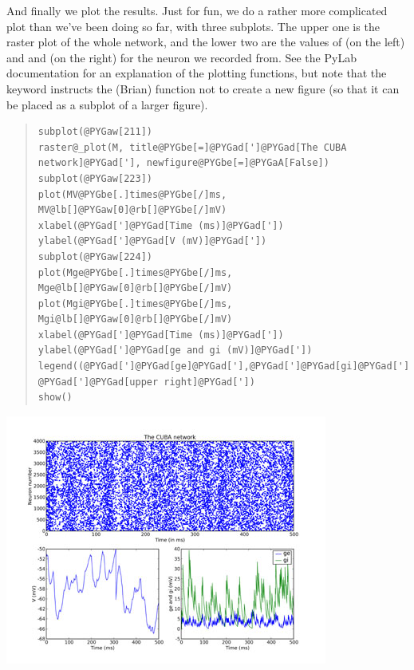 \documentclass[letterpaper,10pt,english]{manual}
\begin{document}
And finally we plot the results. Just for fun, we do a rather more
complicated plot than we've been doing so far, with three subplots.
The upper one is the raster plot of the whole network, and the
lower two are the values of  (on the left) and  and  (on the
right) for the neuron we recorded from. See the PyLab documentation
for an explanation of the plotting functions, but note that the
\hyperlink{brian.raster_plot}{} keyword  instructs the (Brian) function
\hyperlink{brian.raster_plot}{} not to create a new figure (so that it can be placed
as a subplot of a larger figure).
\begin{quote}

\begin{Verbatim}[commandchars=@\[\]]
subplot(@PYGaw[211])
raster@_plot(M, title@PYGbe[=]@PYGad[']@PYGad[The CUBA network]@PYGad['], newfigure@PYGbe[=]@PYGaA[False])
subplot(@PYGaw[223])
plot(MV@PYGbe[.]times@PYGbe[/]ms, MV@lb[]@PYGaw[0]@rb[]@PYGbe[/]mV)
xlabel(@PYGad[']@PYGad[Time (ms)]@PYGad['])
ylabel(@PYGad[']@PYGad[V (mV)]@PYGad['])
subplot(@PYGaw[224])
plot(Mge@PYGbe[.]times@PYGbe[/]ms, Mge@lb[]@PYGaw[0]@rb[]@PYGbe[/]mV)
plot(Mgi@PYGbe[.]times@PYGbe[/]ms, Mgi@lb[]@PYGaw[0]@rb[]@PYGbe[/]mV)
xlabel(@PYGad[']@PYGad[Time (ms)]@PYGad['])
ylabel(@PYGad[']@PYGad[ge and gi (mV)]@PYGad['])
legend((@PYGad[']@PYGad[ge]@PYGad['],@PYGad[']@PYGad[gi]@PYGad[']), @PYGad[']@PYGad[upper right]@PYGad['])
show()
\end{Verbatim}
\end{quote}

\includegraphics{2c.jpg}

\resetcurrentobjects
\end{document}
